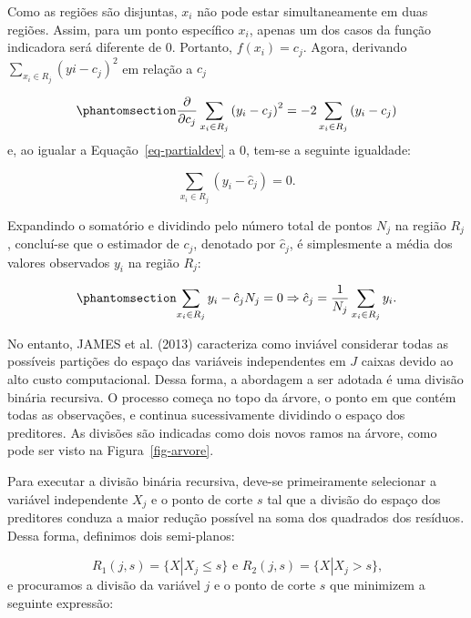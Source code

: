 \documentclass[
  12pt,
  a4paper,
]{scrreprt}
\begin{document}
Como as regiões são disjuntas, \(x_i\) não pode estar simultaneamente em
duas regiões. Assim, para um ponto específico \(x_i\), apenas um dos
casos da função indicadora será diferente de 0. Portanto,
\(f\left(x_i\right) = c_j\). Agora, derivando
\(\sum_{x_i \in R_j}\left(yi - c_j\right)^2\) em relação a \(c_j\)

\begin{equation}\phantomsection\label{eq-partialdev}{
\frac{\partial}{\partial{c_j}}\sum_{x_i \in R_j} \left(y_i - c_j\right)^2 = -2\sum_{x_i \in R_j} \left(y_i - c_j\right)
}\end{equation} e, ao igualar a Equação~\ref{eq-partialdev} a 0, tem-se
a seguinte igualdade:

\[
\sum_{x_i \in R_j} \left(y_i - \hat{c}_j\right) = 0\text{.}
\]

Expandindo o somatório e dividindo pelo número total de pontos \(N_j\)
na região \(R_j\), concluí-se que o estimador de \(c_j\), denotado por
\(\hat{c}_j\), é simplesmente a média dos valores observados \(y_i\) na
região \(R_j\):

\begin{equation}\phantomsection\label{eq-estimacjdev}{
\sum_{x_i \in R_j} y_i - \hat{c}_j N_j = 0 \Rightarrow \hat{c}_j = \frac{1}{N_{j}}\sum_{x_i \in R_j} y_i\text{.}
}\end{equation}

\vspace{12pt}

No entanto, JAMES et al. (2013) caracteriza como inviável considerar
todas as possíveis partições do espaço das variáveis independentes em
\(J\) caixas devido ao alto custo computacional. Dessa forma, a
abordagem a ser adotada é uma divisão binária recursiva. O processo
começa no topo da árvore, o ponto em que contém todas as observações, e
continua sucessivamente dividindo o espaço dos preditores. As divisões
são indicadas como dois novos ramos na árvore, como pode ser visto na
Figura~\ref{fig-arvore}.

\vspace{12pt}

Para executar a divisão binária recursiva, deve-se primeiramente
selecionar a variável independente \(X_j\) e o ponto de corte \(s\) tal
que a divisão do espaço dos preditores conduza a maior redução possível
na soma dos quadrados dos resíduos. Dessa forma, definimos dois
semi-planos:

\[
R_{1}\left(j, s\right) = \{X | X_j \leq s\} \text{ e } R_{2}\left(j, s\right) = \{X | X_j > s\}\text{,}
\] e procuramos a divisão da variável \(j\) e o ponto de corte \(s\) que
minimizem a seguinte expressão:
\end{document}
